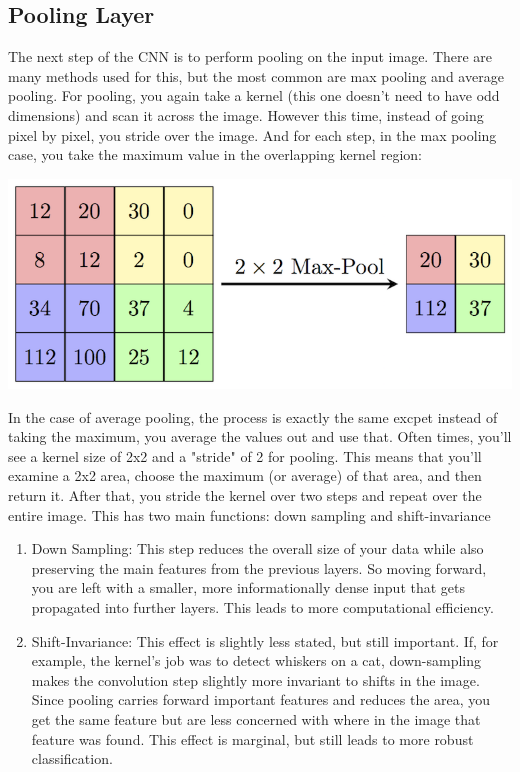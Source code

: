 \documentclass{article}
\begin{document}
    \subsection{Pooling Layer}
        The next step of the CNN is to perform pooling on the input image. There are many methods used for this, but the most common are max pooling and average pooling. For pooling, you again take a kernel (this one doesn't need to have odd dimensions) and scan it across the image. However this time, instead of going pixel by pixel, you stride over the image. And for each step, in the max pooling case, you take the maximum value in the overlapping kernel region:
        
        \begin{center}
            \includegraphics{images/maxpool.png}
        \end{center}
        
        In the case of average pooling, the process is exactly the same excpet instead of taking the maximum, you average the values out and use that. Often times, you'll see a kernel size of 2x2 and a "stride" of 2 for pooling. This means that you'll examine a 2x2 area, choose the maximum (or average) of that area, and then return it. After that, you stride the kernel over two steps and repeat over the entire image. This has two main functions: down sampling and shift-invariance
        
        \begin{enumerate}
            \item Down Sampling: This step reduces the overall size of your data while also preserving the main features from the previous layers. So moving forward, you are left with a smaller, more informationally dense input that gets propagated into further layers. This leads to more computational efficiency.
            \item Shift-Invariance: This effect is slightly less stated, but still important. If, for example, the kernel's job was to detect whiskers on a cat, down-sampling makes the convolution step slightly more invariant to shifts in the image. Since pooling carries forward important features and reduces the area, you get the same feature but are less concerned with where in the image that feature was found. This effect is marginal, but still leads to more robust classification.
        \end{enumerate}
\end{document}

